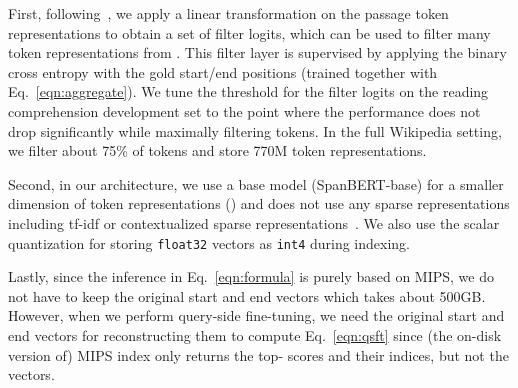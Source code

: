 \documentclass[11pt,a4paper]{article}
\newcommand\ttt[1]{\texttt{#1}}
\begin{document}
First, following~\citet{seo2019real}, we apply a linear transformation on the passage token representations to obtain a set of filter logits, which can be used to filter many token representations from .
This filter layer is supervised by applying the binary cross entropy with the gold start/end positions (trained together with Eq.~\eqref{eqn:aggregate}).
We tune the threshold for the filter logits on the reading comprehension development set to the point where the performance does not drop significantly while maximally filtering tokens.
In the full Wikipedia setting, we filter about 75\% of tokens and store 770M token representations.

Second, in our architecture, we use a base model (SpanBERT-base) for a smaller dimension of token representations () and does not use any sparse representations including tf-idf or contextualized sparse representations~\citep{lee2020contextualized}.
We also use the scalar quantization for storing \ttt{float32} vectors as \ttt{int4} during indexing.

Lastly, since the inference in Eq.~\eqref{eqn:formula} is purely based on MIPS, we do not have to keep the original start and end vectors which takes about 500GB.
However, when we perform query-side fine-tuning, we need the original start and end vectors for reconstructing them to compute Eq.~\eqref{eqn:qsft} since (the on-disk version of) MIPS index only returns the top- scores and their indices, but not the vectors.
 
\end{document}
